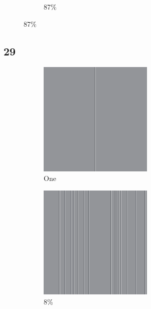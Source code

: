 \documentclass[12pt, fleqn]{report}                             %
\theoremstyle{break}                                            %
\begin{document}
\begin{figure}[ht!]
\begin{subfigure}[b]{0.4\linewidth}
          \caption{87\%}
        \end{subfigure}
      \end{figure}


      \clearpage
      \subsection{29}
      \begin{figure}[ht!]
        \centering
        \begin{subfigure}[b]{0.4\linewidth}
          \includegraphics[width=0.6\textwidth]{Images/29/a.png}
          \caption{One}
        \end{subfigure}
        \begin{subfigure}[b]{0.4\linewidth}
          \includegraphics[width=0.6\textwidth]{Images/29/b.png}
          \caption{8\%}
        \end{subfigure}
        \begin{subfigure}[b]{0.4\linewidth}

\end{subfigure}
\end{figure}
\end{document}
